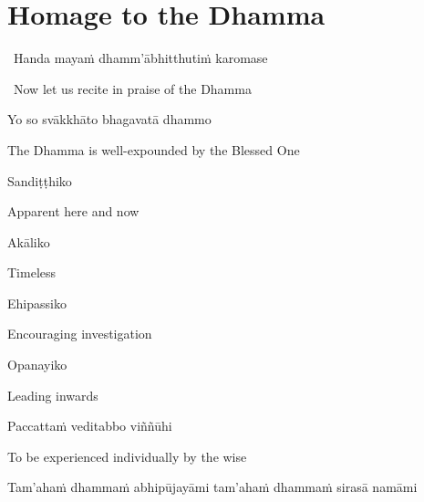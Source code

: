 \section{Homage to the Dhamma}
\label{homage-dhamma}

\begin{leader}
  \anglebracketleft\ \hspace{-0.5mm}Handa mayaṁ dhamm'ābhitthutiṁ karomase \hspace{-0.5mm}\anglebracketright\
\end{leader}
\begin{leader-english-belowpali}
  \anglebracketleft\ \hspace{-0.5mm}Now let us recite in praise of the Dhamma \hspace{-0.5mm}\anglebracketright\
\end{leader-english-belowpali}

Yo so svākkhāto bhagavatā dhammo

\begin{english}
  The Dhamma is well-expounded by the Blessed One
\end{english}

Sandiṭṭhiko

\begin{english}
  Apparent here and now
\end{english}

Akāliko

\begin{english}
  Timeless
\end{english}

Ehipassiko

\begin{english}
  Encouraging investigation
\end{english}

Opanayiko

\begin{english}
  Leading inwards
\end{english}

Paccattaṁ veditabbo viññūhi

\begin{english}
  To be experienced individually by the wise
\end{english}

\suttaRef{[SN 12.41]}

\begin{pali-hang}
  Tam'ahaṁ dhammaṁ abhipūjayāmi tam'ahaṁ dhammaṁ sirasā namāmi
\end{pali-hang}

